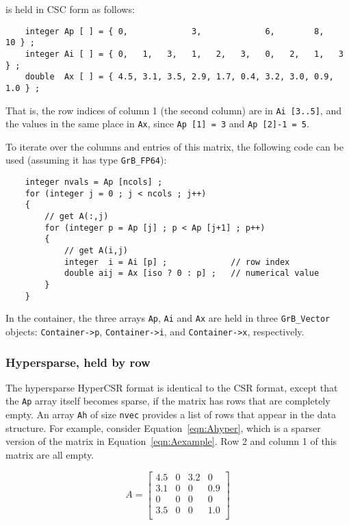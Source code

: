 is held in CSC form as follows:

{\footnotesize
\begin{verbatim}
    integer Ap [ ] = { 0,             3,             6,        8,       10 } ;
    integer Ai [ ] = { 0,   1,   3,   1,   2,   3,   0,   2,   1,   3   } ;
    double  Ax [ ] = { 4.5, 3.1, 3.5, 2.9, 1.7, 0.4, 3.2, 3.0, 0.9, 1.0 } ; \end{verbatim} }

That is, the row indices of column 1 (the second column) are in
\verb'Ai [3..5]', and the values in the same place in \verb'Ax',
since \verb'Ap [1] = 3' and \verb'Ap [2]-1 = 5'.

To iterate over the columns and entries of this matrix, the following code can
be used (assuming it has type \verb'GrB_FP64'):

    {\footnotesize
    \begin{verbatim}
    integer nvals = Ap [ncols] ;
    for (integer j = 0 ; j < ncols ; j++)
    {
        // get A(:,j)
        for (integer p = Ap [j] ; p < Ap [j+1] ; p++)
        {
            // get A(i,j)
            integer  i = Ai [p] ;             // row index
            double aij = Ax [iso ? 0 : p] ;   // numerical value
        }
    } \end{verbatim}}

In the container, the three arrays \verb'Ap', \verb'Ai' and \verb'Ax'
are held in three \verb'GrB_Vector' objects:
\verb'Container->p',
\verb'Container->i', and
\verb'Container->x', respectively.

\subsubsection{Hypersparse, held by row}
\label{format_hypersparse_by_row}

The hypersparse HyperCSR format is identical to the CSR format, except that the
\verb'Ap' array itself becomes sparse, if the matrix has rows that are
completely empty.  An array \verb'Ah' of size \verb'nvec' provides a list of
rows that appear in the data structure.  For example, consider
Equation~\ref{eqn:Ahyper}, which is a sparser version of the matrix in
Equation~\ref{eqn:Aexample}.  Row 2 and column 1 of this matrix are all empty.

    \begin{equation}
    \label{eqn:Ahyper}
    A = \left[
    \begin{array}{cccc}
    4.5 &   0 & 3.2 &   0 \\
    3.1 &   0 &  0  & 0.9 \\
     0  &   0 &  0  &   0 \\
    3.5 &   0 &  0  & 1.0 \\
    \end{array}
    \right]
    \end{equation}

